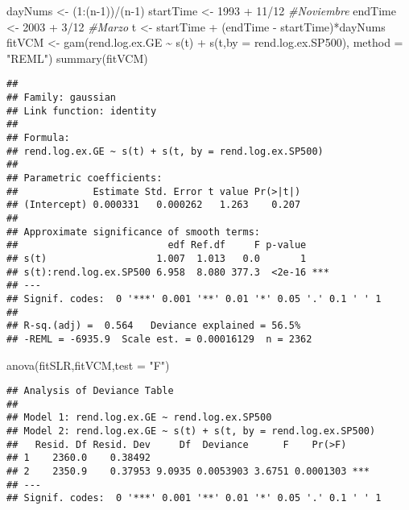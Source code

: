 \documentclass[
]{article}
\newenvironment{Shaded}{\begin{snugshade}}{\end{snugshade}}
\newcommand{\AttributeTok}[1]{\textcolor[rgb]{0.77,0.63,0.00}{#1}}
\newcommand{\CommentTok}[1]{\textcolor[rgb]{0.56,0.35,0.01}{\textit{#1}}}
\newcommand{\DecValTok}[1]{\textcolor[rgb]{0.00,0.00,0.81}{#1}}
\newcommand{\FunctionTok}[1]{\textcolor[rgb]{0.00,0.00,0.00}{#1}}
\newcommand{\NormalTok}[1]{#1}
\newcommand{\OtherTok}[1]{\textcolor[rgb]{0.56,0.35,0.01}{#1}}
\newcommand{\SpecialCharTok}[1]{\textcolor[rgb]{0.00,0.00,0.00}{#1}}
\newcommand{\StringTok}[1]{\textcolor[rgb]{0.31,0.60,0.02}{#1}}
\begin{document}
\begin{Shaded}
\begin{Highlighting}[]
\NormalTok{dayNums }\OtherTok{\textless{}{-}}\NormalTok{ (}\DecValTok{1}\SpecialCharTok{:}\NormalTok{(n}\DecValTok{{-}1}\NormalTok{))}\SpecialCharTok{/}\NormalTok{(n}\DecValTok{{-}1}\NormalTok{)}
\NormalTok{startTime }\OtherTok{\textless{}{-}} \DecValTok{1993} \SpecialCharTok{+} \DecValTok{11}\SpecialCharTok{/}\DecValTok{12} \CommentTok{\#Noviembre}
\NormalTok{endTime }\OtherTok{\textless{}{-}} \DecValTok{2003} \SpecialCharTok{+} \DecValTok{3}\SpecialCharTok{/}\DecValTok{12} \CommentTok{\#Marzo}
\NormalTok{t }\OtherTok{\textless{}{-}}\NormalTok{ startTime }\SpecialCharTok{+}\NormalTok{ (endTime }\SpecialCharTok{{-}}\NormalTok{ startTime)}\SpecialCharTok{*}\NormalTok{dayNums}
\NormalTok{fitVCM }\OtherTok{\textless{}{-}} \FunctionTok{gam}\NormalTok{(rend.log.ex.GE }\SpecialCharTok{\textasciitilde{}} \FunctionTok{s}\NormalTok{(t) }\SpecialCharTok{+} \FunctionTok{s}\NormalTok{(t,}\AttributeTok{by =}\NormalTok{ rend.log.ex.SP500), }\AttributeTok{method =} \StringTok{"REML"}\NormalTok{)}
\FunctionTok{summary}\NormalTok{(fitVCM)}
\end{Highlighting}
\end{Shaded}

\begin{verbatim}
## 
## Family: gaussian 
## Link function: identity 
## 
## Formula:
## rend.log.ex.GE ~ s(t) + s(t, by = rend.log.ex.SP500)
## 
## Parametric coefficients:
##             Estimate Std. Error t value Pr(>|t|)
## (Intercept) 0.000331   0.000262   1.263    0.207
## 
## Approximate significance of smooth terms:
##                          edf Ref.df     F p-value    
## s(t)                   1.007  1.013   0.0       1    
## s(t):rend.log.ex.SP500 6.958  8.080 377.3  <2e-16 ***
## ---
## Signif. codes:  0 '***' 0.001 '**' 0.01 '*' 0.05 '.' 0.1 ' ' 1
## 
## R-sq.(adj) =  0.564   Deviance explained = 56.5%
## -REML = -6935.9  Scale est. = 0.00016129  n = 2362
\end{verbatim}

\begin{Shaded}
\begin{Highlighting}[]
\FunctionTok{anova}\NormalTok{(fitSLR,fitVCM,}\AttributeTok{test =} \StringTok{"F"}\NormalTok{)}
\end{Highlighting}
\end{Shaded}

\begin{verbatim}
## Analysis of Deviance Table
## 
## Model 1: rend.log.ex.GE ~ rend.log.ex.SP500
## Model 2: rend.log.ex.GE ~ s(t) + s(t, by = rend.log.ex.SP500)
##   Resid. Df Resid. Dev     Df  Deviance      F    Pr(>F)    
## 1    2360.0    0.38492                                      
## 2    2350.9    0.37953 9.0935 0.0053903 3.6751 0.0001303 ***
## ---
## Signif. codes:  0 '***' 0.001 '**' 0.01 '*' 0.05 '.' 0.1 ' ' 1
\end{verbatim}
\end{document}
